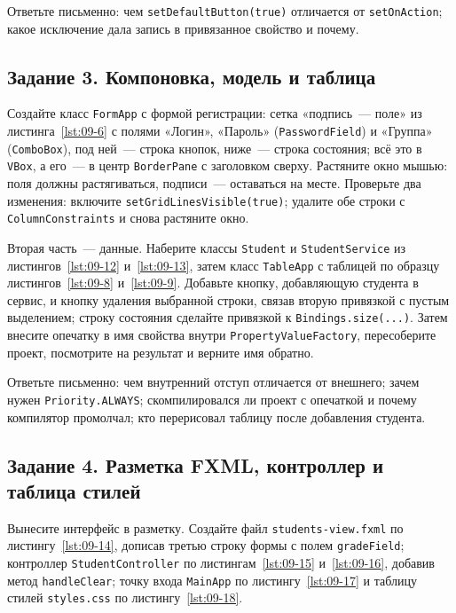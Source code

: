 Ответьте письменно: чем \texttt{setDefaultButton(true)} отличается от
\texttt{setOnAction}; какое исключение дала запись в привязанное свойство и
почему.

\subsection*{Задание 3. Компоновка, модель и таблица}

Создайте класс \texttt{FormApp} с формой регистрации: сетка «подпись~--- поле»
из листинга~\ref{lst:09-6} с полями «Логин», «Пароль» (\texttt{PasswordField}) и
«Группа» (\texttt{ComboBox}), под ней~--- строка кнопок, ниже~--- строка
состояния; всё это в \texttt{VBox}, а его~--- в центр \texttt{BorderPane} с
заголовком сверху. Растяните окно мышью: поля должны растягиваться, подписи~---
оставаться на месте. Проверьте два изменения: включите
\texttt{setGridLinesVisible(true)}; удалите обе строки с
\texttt{ColumnConstraints} и снова растяните окно.

Вторая часть~--- данные. Наберите классы \texttt{Student} и
\texttt{StudentService} из листингов~\ref{lst:09-12} и~\ref{lst:09-13}, затем
класс \texttt{TableApp} с таблицей по образцу листингов~\ref{lst:09-8}
и~\ref{lst:09-9}. Добавьте кнопку, добавляющую студента в сервис, и кнопку
удаления выбранной строки, связав вторую привязкой с пустым выделением; строку
состояния сделайте привязкой к \texttt{Bindings.size(...)}. Затем внесите
опечатку в имя свойства внутри \texttt{PropertyValueFactory}, пересоберите
проект, посмотрите на результат и верните имя обратно.

Ответьте письменно: чем внутренний отступ отличается от внешнего; зачем нужен
\texttt{Priority.ALWAYS}; скомпилировался ли проект с опечаткой и почему
компилятор промолчал; кто перерисовал таблицу после добавления студента.

\subsection*{Задание 4. Разметка FXML, контроллер и таблица стилей}

Вынесите интерфейс в разметку. Создайте файл \texttt{students-view.fxml} по
листингу~\ref{lst:09-14}, дописав третью строку формы с полем
\texttt{gradeField}; контроллер \texttt{StudentController} по
листингам~\ref{lst:09-15} и~\ref{lst:09-16}, добавив метод
\texttt{handleClear}; точку входа \texttt{MainApp} по листингу~\ref{lst:09-17} и
таблицу стилей \texttt{styles.css} по листингу~\ref{lst:09-18}.

